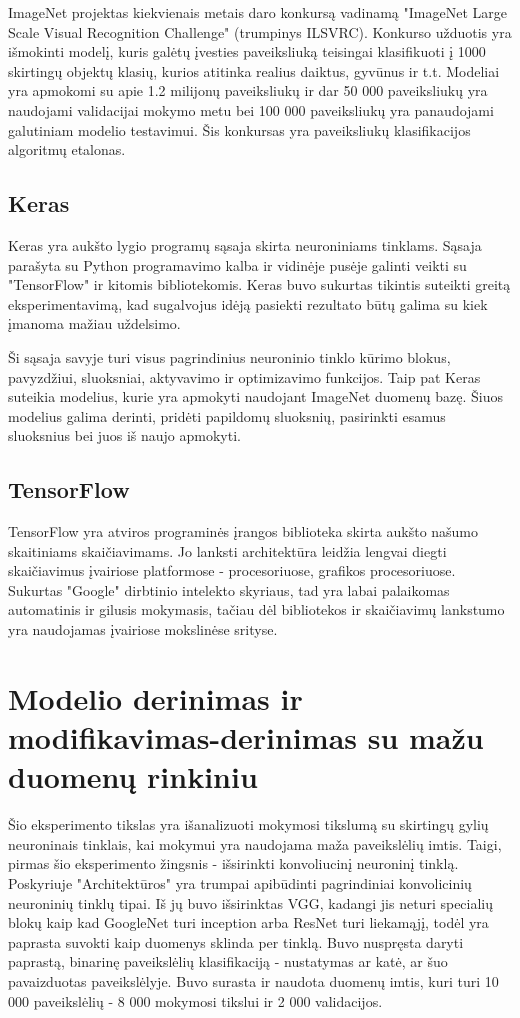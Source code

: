 \documentclass{VUMIFPSkursinis}
\begin{document}
ImageNet projektas kiekvienais metais daro konkursą vadinamą "ImageNet Large Scale Visual Recognition Challenge" (trumpinys ILSVRC). Konkurso užduotis yra 
išmokinti modelį, kuris galėtų įvesties paveiksliuką teisingai klasifikuoti į 1000 skirtingų objektų klasių, kurios atitinka realius daiktus, gyvūnus ir t.t. Modeliai 
yra apmokomi su apie 1.2 milijonų paveiksliukų ir dar 50 000 paveiksliukų yra naudojami validacijai mokymo metu bei 100 000 paveiksliukų yra panaudojami galutiniam 
modelio testavimui. Šis konkursas yra paveiksliukų klasifikacijos algoritmų etalonas.

\subsection{Keras}
Keras yra aukšto lygio programų sąsaja skirta neuroniniams tinklams. Sąsaja parašyta su Python programavimo kalba ir vidinėje pusėje galinti veikti su "TensorFlow" 
ir kitomis bibliotekomis. Keras buvo sukurtas tikintis suteikti greitą eksperimentavimą, kad sugalvojus idėją pasiekti rezultato būtų galima su kiek įmanoma mažiau uždelsimo.

Ši sąsaja savyje turi visus pagrindinius neuroninio tinklo kūrimo blokus, pavyzdžiui, sluoksniai, aktyvavimo ir optimizavimo funkcijos. Taip pat Keras suteikia modelius, 
kurie yra apmokyti naudojant ImageNet duomenų bazę. Šiuos modelius galima derinti, pridėti papildomų sluoksnių, pasirinkti esamus sluoksnius bei juos iš naujo apmokyti.

\subsection{TensorFlow}
TensorFlow yra atviros programinės įrangos biblioteka skirta aukšto našumo skaitiniams skaičiavimams. Jo lanksti architektūra leidžia lengvai diegti skaičiavimus įvairiose 
platformose - procesoriuose, grafikos procesoriuose. Sukurtas "Google" dirbtinio intelekto skyriaus, tad yra labai palaikomas automatinis ir gilusis mokymasis, tačiau 
dėl bibliotekos ir skaičiavimų lankstumo yra naudojamas įvairiose mokslinėse srityse.

\section{Modelio derinimas ir modifikavimas-derinimas su mažu duomenų rinkiniu}
Šio eksperimento tikslas yra išanalizuoti mokymosi tikslumą su skirtingų gylių neuroninais tinklais, kai mokymui yra naudojama maža paveikslėlių imtis. Taigi, pirmas 
šio eksperimento žingsnis - išsirinkti konvoliucinį neuroninį tinklą. Poskyriuje "Architektūros" yra trumpai apibūdinti pagrindiniai konvolicinių neuroninių tinklų tipai. 
Iš jų buvo išsirinktas VGG, kadangi jis neturi specialių blokų kaip kad GoogleNet turi inception arba ResNet turi liekamąjį, todėl yra paprasta suvokti kaip duomenys sklinda per tinklą. Buvo nuspręsta daryti paprastą, binarinę paveikslėlių 
klasifikaciją - nustatymas ar katė, ar šuo pavaizduotas paveikslėlyje. Buvo surasta ir naudota duomenų imtis, kuri turi 10 000 paveikslėlių - 8 000 mokymosi tikslui ir 2 000 validacijos.
\end{document}
